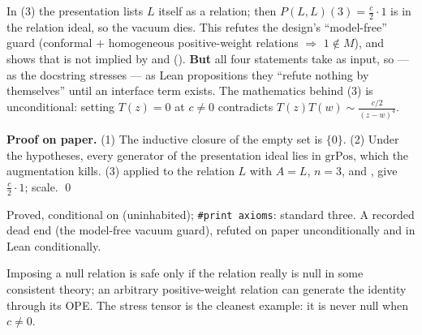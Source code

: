 \begin{dictionary}
In (3) the presentation  lists $L$ itself as a relation; then $P(L,L)(3) = \frac c2\cdot1$ is in the
relation ideal, so the vacuum dies. This refutes the design's ``model-free'' guard (conformal $+$ homogeneous positive-weight
relations $\Rightarrow$ $1\notin M$), and shows that  is not implied by  and 
(\allowbreak{}\allowbreak{}). \textbf{But} all four statements take  as input, so --- as the docstring stresses
--- as Lean propositions they ``refute nothing by themselves'' until an interface term exists. The mathematics behind (3) is
unconditional: setting $T(z) = 0$ at $c\neq0$ contradicts $T(z)T(w)\sim\frac{c/2}{(z-w)^4}$.
\end{dictionary}

\textbf{Proof on paper.} (1) The inductive closure of the empty set is $\{0\}$. (2) Under the hypotheses, every generator of the
presentation ideal lies in $\mathrm{grPos}$, which the augmentation kills. (3)  applied to the relation $L$ with $A = L$,
$n=3$, and , give $\frac c2\cdot1$; scale. \qed

\begin{status}
Proved, conditional on  (uninhabited); \texttt{\#print axioms}: standard three. A recorded dead end (the
model-free vacuum guard), refuted on paper unconditionally and in Lean conditionally.
\end{status}

\begin{physics}
Imposing a null relation is safe only if the relation really is null in some consistent theory; an arbitrary positive-weight
relation can generate the identity through its OPE. The stress tensor is the cleanest example: it is never null when $c\neq0$.
\end{physics}

